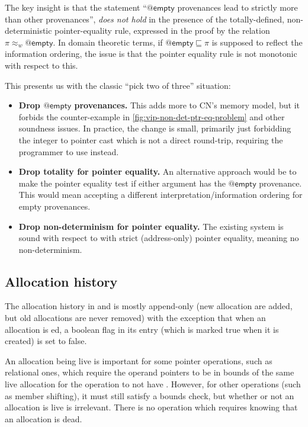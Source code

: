 The key insight is that the statement ``$@\mathsf{empty}$ provenances lead to
strictly more  than other provenances'', \emph{does not hold} in the
presence of the totally-defined, non-deterministic pointer-equality rule,
expressed in the proof by the relation $\pi \approx_w @\mathsf{empty}$. In
domain theoretic terms, if $@\mathsf{empty} \sqsubseteq \pi$ is supposed to
reflect the information ordering, the issue is that the pointer equality rule
is not monotonic with respect to this.

This presents us with the classic ``pick two of three'' situation:
\begin{itemize}
    \item \textbf{Drop $@\mathsf{empty}$ provenances.} This adds more 
        to CN's memory model, but it forbids the counter-example in
        \cref{fig:vip-non-det-ptr-eq-problem} and other soundness
        issues.
        In practice, the change is small, primarily just forbidding the integer
        to pointer cast which is not a direct round-trip, requiring the
        programmer to use  instead.
    \item \textbf{Drop totality for pointer equality.} An alternative approach
        would be to make the pointer equality test  if either argument
        has the $@\mathsf{empty}$ provenance. This would mean accepting a
        different interpretation/information ordering for empty provenances.
    \item \textbf{Drop non-determinism for pointer equality.} The existing
         system is sound with respect to  with strict
        (address-only) pointer equality, meaning no non-determinism.
\end{itemize}

\subsection{Allocation history}\label{subsec:alloc-history}

The allocation history in  and  is mostly append-only
(new allocation are added, but old allocations are never removed) with the
exception that when an allocation is ed, a boolean flag in its
entry (which is marked true when it is created) is set to false.

An allocation being live is important for some pointer operations, such as
relational ones, which require the operand pointers to be in bounds of the same
live allocation for the operation to not have . However, for other
operations (such as member shifting), it must still satisfy a bounds check, but
whether or not an allocation is live is irrelevant. There is no operation which
requires knowing that an allocation is dead.

